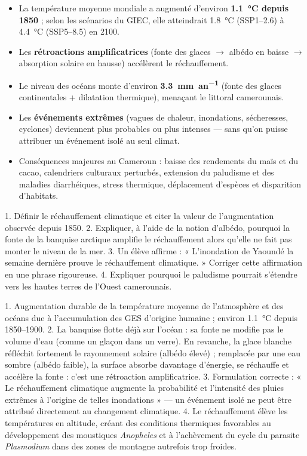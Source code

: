 \documentclass[11pt]{article}
\begin{document}
\begin{aretenir}
\begin{itemize}
\item La température moyenne mondiale a augmenté d'environ \textbf{\SI{1,1}{\celsius} depuis 1850} ; selon les scénarios du GIEC, elle atteindrait \SI{1,8}{\celsius} (SSP1--2.6) à \SI{4,4}{\celsius} (SSP5--8.5) en 2100.
\item Les \textbf{rétroactions amplificatrices} (fonte des glaces $\rightarrow$ albédo en baisse $\rightarrow$ absorption solaire en hausse) accélèrent le réchauffement.
\item Le niveau des océans monte d'environ \textbf{\SI{3,3}{mm.an^{-1}}} (fonte des glaces continentales + dilatation thermique), menaçant le littoral camerounais.
\item Les \textbf{événements extrêmes} (vagues de chaleur, inondations, sécheresses, cyclones) deviennent plus probables ou plus intenses — sans qu'on puisse attribuer un événement isolé au seul climat.
\item Conséquences majeures au Cameroun : baisse des rendements du maïs et du cacao, calendriers culturaux perturbés, extension du paludisme et des maladies diarrhéiques, stress thermique, déplacement d'espèces et disparition d'habitats.
\end{itemize}
\end{aretenir}

\begin{exercice}
1. Définir le réchauffement climatique et citer la valeur de l'augmentation observée depuis 1850.
2. Expliquer, à l'aide de la notion d'albédo, pourquoi la fonte de la banquise arctique amplifie le réchauffement alors qu'elle ne fait pas monter le niveau de la mer.
3. Un élève affirme : « L'inondation de Yaoundé la semaine dernière prouve le réchauffement climatique. » Corriger cette affirmation en une phrase rigoureuse.
4. Expliquer pourquoi le paludisme pourrait s'étendre vers les hautes terres de l'Ouest camerounais.
\end{exercice}

\begin{corrige}
1. Augmentation durable de la température moyenne de l'atmosphère et des océans due à l'accumulation des GES d'origine humaine ; environ \SI{1,1}{\celsius} depuis 1850--1900.
2. La banquise flotte déjà sur l'océan : sa fonte ne modifie pas le volume d'eau (comme un glaçon dans un verre). En revanche, la glace blanche réfléchit fortement le rayonnement solaire (albédo élevé) ; remplacée par une eau sombre (albédo faible), la surface absorbe davantage d'énergie, se réchauffe et accélère la fonte : c'est une rétroaction amplificatrice.
3. Formulation correcte : « Le réchauffement climatique augmente la probabilité et l'intensité des pluies extrêmes à l'origine de telles inondations » — un événement isolé ne peut être attribué directement au changement climatique.
4. Le réchauffement élève les températures en altitude, créant des conditions thermiques favorables au développement des moustiques \emph{Anopheles} et à l'achèvement du cycle du parasite \emph{Plasmodium} dans des zones de montagne autrefois trop froides.
\end{corrige}
\end{document}
